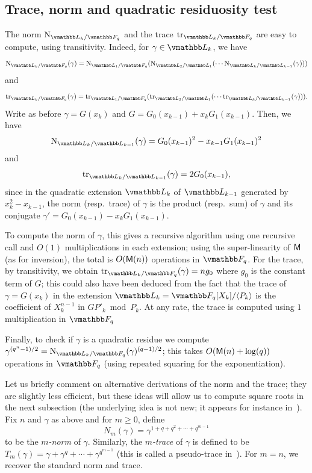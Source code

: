 
\subsection{Trace, norm and quadratic residuosity test}

The norm $\norm_{\L_k/\F_q}$ and the trace $\trace_{\L_k/\F_q}$
are easy to compute, using transitivity. Indeed, for $\gamma \in
\L_k$, we have
$$\norm_{\L_k / \F_q}(\gamma) = \norm_{\L_1 / \F_q}(\norm_{\L_2 / \L_1}(\cdots \norm_{\L_k / \L_{k -
    1}}(\gamma)))$$
and
$$\trace_{\L_k / \F_q}(\gamma) = \trace_{\L_1 / \F_q}(\trace_{\L_2 /
  \L_1}(\cdots \trace_{\L_k / \L_{k - 1}}(\gamma))).$$ Write as before
$\gamma=G(x_k)$ and $G=G_0(x_{k-1})+x_k G_1(x_{k-1})$.  Then, we have
$$\norm_{\L_k / \L_{k - 1}}(\gamma) =  G_0(x_{k - 1})^2 - x_{k - 1}G_1(x_{k - 1})^2$$
and
$$\trace_{\L_k / \L_{k - 1}}(\gamma) = 2G_0(x_{k - 1}),$$ since in the
quadratic extension $\L_k$ of $\L_{k-1}$ generated by $x_k^2-x_{k-1}$,
the norm (resp.\ trace) of $\gamma$ is the product (resp.\ sum) of
$\gamma$ and its conjugate $\gamma'=G_0(x_{k-1})-x_k G_1(x_{k-1})$.

To compute the norm of $\gamma$, this gives a recursive algorithm
using one recursive call and $O(1)$ multiplications in each extension;
using the super-linearity of $\mathsf{M}$ (as for inversion), the total is
$O(\mathsf{M}(n))$ operations in $\F_q$. For the trace, by transitivity, we
obtain $\trace_{\L_k / \F_q}(\gamma) = n g_0$ where $g_0$ is the constant
term of $G$; this could also have been deduced from the fact that the
trace of $\gamma=G(x_k)$ in the extension $\L_k=\F_q[X_k]/\langle P_k
\rangle$ is the coefficient of $X_k^{n-1}$ in $G P'_k \bmod P_k$.  At
any rate, the trace is computed using $1$ multiplication in $\F_q$

Finally, to check if $\gamma$ is a quadratic residue we compute
$\gamma^{(q^n - 1) / 2} = \norm_{\L_k / \F_q}(\gamma)^{(q - 1) / 2}$; this
takes $O(\mathsf{M}(n) + \log(q))$ operations in $\F_q$ (using repeated squaring
for the exponentiation).

Let us briefly comment on alternative derivations of the norm and the
trace; they are slightly less efficient, but these ideas will allow us
to compute square roots in the next subsection (the underlying idea is
not new; it appears for instance in~\cite{GaSh92,FeNoMo03}).
Fix $n$ and $\gamma$ as above and for $m \ge 0$, define
$$N_m(\gamma) = \gamma^{1 + q + q^2 + \cdots + q^{m - 1}}$$ to be the
{\em $m$-norm} of $\gamma$. Similarly, the {\em $m$-trace} of $\gamma$
is defined to be $T_m(\gamma) = \gamma + \gamma^q + \cdots +
\gamma^{q^{m - 1}}$ (this is called a pseudo-trace
in~\cite{DeSc12}). For $m=n$, we recover the standard norm and trace.

